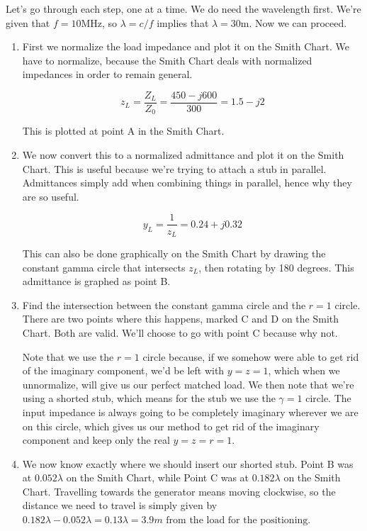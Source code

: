 \documentclass{article}
\begin{document}
Let's go through each step, one at a time. We do need the wavelength first. We're given that $f = 10$MHz, so $\lambda = c/f$ implies that $\lambda = 30$m. Now we can proceed.

\begin{enumerate}
    \item First we normalize the load impedance and plot it on the Smith Chart. We have to normalize, because the Smith Chart deals with normalized impedances in order to remain general.

    $$z_L = \frac{Z_L}{Z_0} = \frac{450 - j600}{300} = 1.5 - j2$$

    This is plotted at point A in the Smith Chart.

    \item We now convert this to a normalized admittance and plot it on the Smith Chart. This is useful because we're trying to attach a stub in parallel. Admittances simply add when combining things in parallel, hence why they are so useful.

    $$y_L = \frac{1}{z_L} = 0.24 + j0.32$$

    This can also be done graphically on the Smith Chart by drawing the constant gamma circle that intersects $z_L$, then rotating by 180 degrees. This admittance is graphed as point B.

    \item Find the intersection between the constant gamma circle and the $r = 1$ circle. There are two points where this happens, marked C and D on the Smith Chart. Both are valid. We'll choose to go with point C because why not.

    Note that we use the $r = 1$ circle because, if we somehow were able to get rid of the imaginary component, we'd be left with $y = z = 1$, which when we unnormalize, will give us our perfect matched load. We then note that we're using a shorted stub, which means for the stub we use the $\gamma = 1$ circle. The input impedance is always going to be completely imaginary wherever we are on this circle, which gives us our method to get rid of the imaginary component and keep only the real $y = z = r = 1$.

    \item We now know exactly where we should insert our shorted stub. Point B was at $0.052\lambda$ on the Smith Chart, while Point C was at $0.182 \lambda$ on the Smith Chart. Travelling towards the generator means moving clockwise, so the distance we need to travel is simply given by $0.182 \lambda - 0.052 \lambda = 0.13 \lambda = \boxed{3.9 m \text{ from the load for the positioning}}$.


\end{enumerate}
\end{document}
